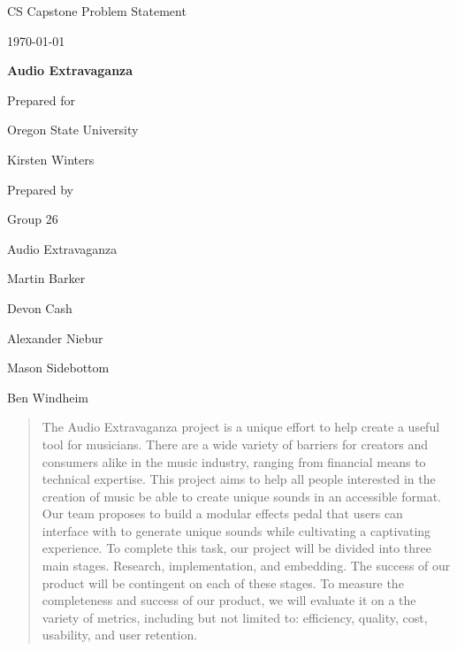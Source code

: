 \documentclass[onecolumn, draftclsnofoot,10pt, compsoc]{IEEEtran}
\def \CapstoneTeamName{Audio Extravaganza}
\def \CapstoneTeamNumber{26}
\def \GroupMemberOne{Martin Barker}
\def \GroupMemberTwo{Devon Cash}
\def \GroupMemberThree{Alexander Niebur}
\def \GroupMemberFour{Mason Sidebottom}
\def \GroupMemberFive{Ben Windheim}
\def \CapstoneProjectName{Audio Extravaganza}
\def \CapstoneSponsorCompany{Oregon State University}
\def \CapstoneSponsorPerson{Kirsten Winters}
\def \DocType{Problem Statement
  }
\newcommand{\NameSigPair}[1]{\par
  \makebox[2.75in][r]{#1} \hfil \makebox[3.25in]{\makebox[2.25in]{\hrulefill} \hfill\makebox[.75in]{\hrulefill}}
\par\vspace{-12pt} \textit{\tiny\noindent
  \makebox[2.75in]{} \hfil\makebox[3.25in]{\makebox[2.25in][r]{Signature} \hfill\makebox[.75in][r]{Date}}}}
\renewcommand{\NameSigPair}[1]{#1}
\begin{document}
\begin{titlepage}
    \begin{singlespace}
        \hfill 
        \par\vspace{.2in}
        \centering
        \scshape{
            \huge CS Capstone \DocType \par
            {\large\today}\par
            \vspace{.5in}
            \textbf{\Huge\CapstoneProjectName}\par
            \vfill
            {\large Prepared for}\par
            \Huge \CapstoneSponsorCompany\par
            \vspace{5pt}
            {\Large\NameSigPair{\CapstoneSponsorPerson}\par}
            {\large Prepared by }\par
            Group \CapstoneTeamNumber\par
            \CapstoneTeamName\par 
            \vspace{5pt}
            {\Large
                \NameSigPair{\GroupMemberOne}\par
                \NameSigPair{\GroupMemberTwo}\par
                \NameSigPair{\GroupMemberThree}\par
                \NameSigPair{\GroupMemberFour}\par
                \NameSigPair{\GroupMemberFive}\par
            }
            \vspace{20pt}
        }
        \begin{abstract}
          The Audio Extravaganza project is a unique effort to help create a useful tool for musicians. There are a wide variety of barriers for creators and consumers alike in the music industry, ranging from financial means to technical expertise. This project aims to help all people interested in the creation of music be able to create unique sounds in an accessible format. Our team proposes to build a modular effects pedal that users can interface with to generate unique sounds while cultivating a captivating experience. To complete this task, our project will be divided into three main stages. Research, implementation, and embedding. The success of our product will be contingent on each of these stages. To measure the completeness and success of our product, we will evaluate it on a the variety of metrics, including but not limited to: efficiency, quality, cost, usability, and user retention.
        \end{abstract}     
    \end{singlespace}
\end{titlepage}
\end{document}
